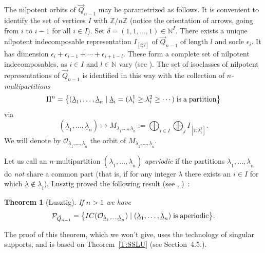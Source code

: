 \documentclass[a4paper,10pt]{amsart}
\def\Z{\mathbb{Z}}
\def\N{\mathbb{N}}
\newtheorem{theo}{\bf{Theorem}}[section]
\numberwithin{equation}{section}
\begin{document}
\vspace{.1in}

The nilpotent orbits of $\vec{Q}_{n-1}$ may be parametrized as follows. It is convenient to identify the set of vertices $I$ with $\Z/n\Z$ (notice the orientation of arrows, going from $i$ to $i-1$ for all $i \in I$). Set $\delta=(1, 1, \ldots, 1) \in \N^I$. There exists a unique nilpotent indecomposable representation $I_{[i;l]}$ of $\vec{Q}_{n-1}$ of length $l$ and socle $\epsilon_i$. It has dimension $\epsilon_{i} + \epsilon_{i-1} + \cdots + \epsilon_{i+1-l}$. These form a complete set of nilpotent indecomposables, as $i \in I$ and $l \in \N$ vary (see \cite[Prop.~3.24]{Trieste}). The set of isoclasses of nilpotent representations of $\vec{Q}_{n-1}$ is identified in this way with the collection of \textit{$n$-multipartitions}
$$\Pi^n=\big\{ (\underline{\lambda}_1, \ldots, \underline{\lambda}_n\; | \; \underline{\lambda}_i = (\lambda_i^1 \geq \lambda_i^2 \geq \cdots ) \;\text{is\;a\;partition}\big\}$$
via
$$(\underline{\lambda}_1, \ldots, \underline{\lambda}_n) \mapsto M_{\underline{\lambda}_1, \ldots, \underline{\lambda}_n} := \bigoplus_{i \in I} \bigoplus_{j} I_{[i;\lambda_i^j]}.$$
We will denote by $\mathcal{O}_{\underline{\lambda}_1, \ldots, \underline{\lambda}_n}$ the orbit of $M_{\underline{\lambda}_1, \ldots, \underline{\lambda}_n}$. 

\vspace{.2in}

 Let us call an $n$-multipartition $(\underline{\lambda}_1, \ldots, \underline{\lambda}_n)$ \textit{aperiodic} if the partitions 
$\underline{\lambda}_1, \ldots, \underline{\lambda}_n$ do \textit{not} share a common part (that is, if for any integer $\lambda$ there exists an $i \in I$ for which $\lambda \not\in \underline{\lambda}_i$). Lusztig proved the following result (see \cite{Lusaff}, \cite{Lusaper})~:

\vspace{.1in}

\begin{theo}[Lusztig]\label{P:Luscyc} If $n >1$ we have
$$\mathcal{P}_{\vec{Q}_{n-1}}=\big\{ IC(\mathcal{O}_{\underline{\lambda}_1, \ldots, \underline{\lambda}_n})\;|\; (\underline{\lambda}_1, \ldots, \underline{\lambda}_n)\;\text{is\;aperiodic}\big\}.$$
\end{theo}

The proof of this theorem, which we won't give, uses the technology of singular supports, and is based on Theorem~\ref{T:SSLU} (see Section~4.5.). 
\end{document}
